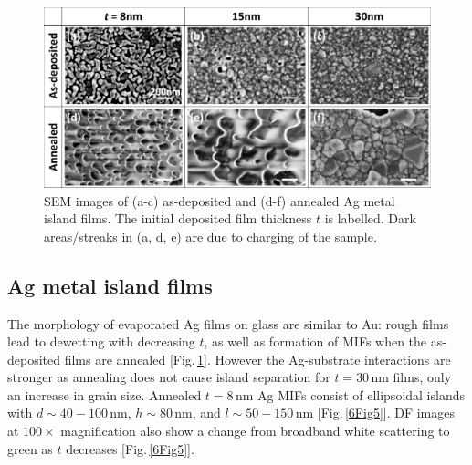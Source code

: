 \begin{figure}[h!] 
\centering    
\includegraphics[width=\textwidth]{Fig4}
\caption{SEM images of (a-c) as-deposited and (d-f) annealed Ag metal island films. The initial deposited film thickness $t$ is labelled. Dark areas/streaks in (a, d, e) are due to charging of the sample.}
\label{6Fig4}
\end{figure}
\subsection{Ag metal island films}

The morphology of evaporated Ag films on glass are similar to Au: rough films lead to dewetting with decreasing $t$, as well as formation of MIFs when the as-deposited films are annealed [Fig.\,\ref{6Fig4}]. However the Ag-substrate interactions are stronger as annealing does not cause island separation for $t=30$\,nm films, only an increase in grain size. Annealed $t=8$\,nm Ag MIFs consist of ellipsoidal islands with $d \sim40-100$\,nm, $h\sim80$\,nm, and $l\sim50-150$\,nm [Fig.\,\ref{6Fig5}]. DF images at $100\times$ magnification also show a change from broadband white scattering to green as $t$ decreases [Fig.\,\ref{6Fig5}]. 

